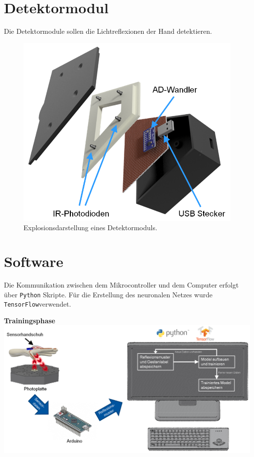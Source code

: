 ﻿\documentclass{sciposter}
\begin{document}
\begin{multicols}{3}

\section{Detektormodul}
\noindent
Die Detektormodule sollen die Lichtreflexionen der Hand detektieren.

\begin{figure}[h]
	\centering
	\includegraphics[scale=1.2]{../CAD_Bilder/Detektormodul/Detektormodul_beschriftet.png}
	\caption{Explosionsdarstellung eines Detektormoduls.}
	\label{fig:Detektormodul}
\end{figure}


\section{Software}
\noindent
Die Kommunikation zwischen dem Mikrocontroller und dem Computer erfolgt über \texttt{Python} Skripte. Für die Erstellung des neuronalen Netzes wurde \texttt{TensorFlow}\texttrademark verwendet.

\centering

\vfill

\textbf{Trainingsphase}\\
\vspace{1.0cm}
\includegraphics[scale=0.7]{../figures/Anlernphase.png}


\end{multicols}
\end{document}

